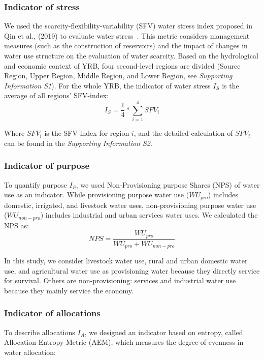 \documentclass[draft]{agujournal2019}
\begin{document}
	\subsubsection*{Indicator of stress}
	We used the scarcity-flexibility-variability (SFV) water stress index proposed in Qin et al., (2019) to evaluate water stress~\cite{qin2019}. This metric considers management measures (such as the construction of reservoirs) and the impact of changes in water use structure on the evaluation of water scarcity. Based on the hydrological and economic context of YRB, four second-level regions are divided (Source Region, Upper Region, Middle Region, and Lower Region, see \textit{Supporting Information S1}). For the whole YRB, the indicator of water stress $I_S$ is the average of all regions' SFV-index:
	\begin{equation}
		I_S = \frac{1}{4} * \sum_{i=1}^4 SFV_{i}
	\end{equation}

	Where $SFV_i$ is the SFV-index for region $i$, and the detailed calculation of $SFV_i$ can be found in the \textit{Supporting Information S2}.

	\subsubsection*{Indicator of purpose}
	To quantify purpose $I_P$, we used Non-Provisioning purpose Shares (NPS) of water use as an indicator. While provisioning purpose water use ($WU_{pro}$) includes domestic, irrigated, and livestock water uses, non-provisioning purpose water use ($WU_{non-pro}$) includes industrial and urban services water uses. We calculated the NPS as:
	\begin{equation}
		NPS = \frac{WU_{pro}}{WU_{pro} + WU_{non-pro}}
	\end{equation}

	In this study, we consider livestock water use, rural and urban domestic water use, and agricultural water use as provisioning water because they directly service for survival. Others are non-provisioning: services and industrial water use because they mainly service the economy.

	\subsubsection*{Indicator of allocations}
	To describe allocations $I_A$, we designed an indicator based on entropy, called Allocation Entropy Metric (AEM), which measures the degree of evenness in water allocation:
\end{document}
